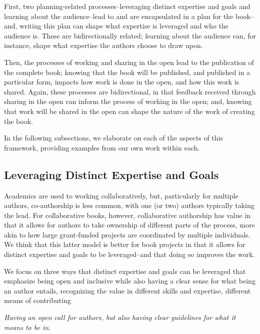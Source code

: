 \documentclass[
  english,
  man]{apa6}
\begin{document}
First, two planning-related processes--leveraging distinct expertise and goals and learning about the audience--lead to and are encapsulated in a plan for the book--and, writing this plan can shape what expertise is leveraged and who the audience is. These are bidirectionally related; learning about the audience can, for instance, shape what expertise the authors choose to draw upon.

Then, the processes of working and sharing in the open lead to the publication of the complete book; knowing that the book will be published, and published in a particular form, impacts how work is done in the open, and how this work is shared. Again, these processes are bidirectional, in that feedback received through sharing in the open can inform the process of working in the open; and, knowing that work will be shared in the open can shape the nature of the work of creating the book.

In the following subsections, we elaborate on each of the aspects of this framework, providing examples from our own work within each.

\hypertarget{leveraging-distinct-expertise-and-goals}{%
\subsection{Leveraging Distinct Expertise and Goals}\label{leveraging-distinct-expertise-and-goals}}

Academics are used to working collaboratively, but, particularly for multiple authors, co-authorship is less common, with one (or two) authors typically taking the lead. For collaborative books, however, collaborative authorship has value in that it allows for authors to take ownership of different parts of the process, more akin to how large grant-funded projects are coordinated by multiple individuals. We think that this latter model is better for book projects in that it allows for distinct expertise and goals to be leveraged--and that doing so improves the work.

We focus on three ways that distinct expertise and goals can be leveraged that emphasize being open and inclusive while also having a clear sense for what being an author entails, recognizing the value in different skills and expertise, different means of contributing

\emph{Having an open call for authors, but also having clear guidelines for what it means to be in.}
\end{document}
